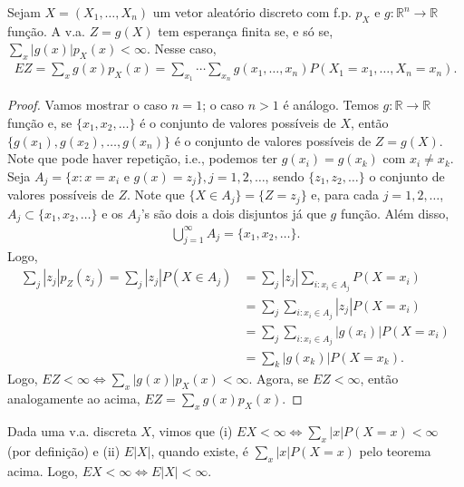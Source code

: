 \documentclass[../Notas.tex]{subfiles}
\begin{document}
\begin{theorem}
Sejam $X = (X_1, \dots, X_n)$ um vetor aleatório discreto com f.p. $p_X$ e $g:\mathbb{R}^n\to\mathbb{R}$ função. A v.a. $Z = g(X)$ tem esperança finita se, e só se, $\displaystyle{ \sum_x |g(x)|p_X(x) < \infty }$. Nesse caso,
\begin{align*}
    EZ = \sum_x g(x)p_X(x) = \sum_{x_1}\cdots\sum_{x_n} g(x_1, \dots, x_n)P(X_1 = x_1, \dots, X_n=x_n).
\end{align*}
\end{theorem}

\begin{proof}
Vamos mostrar o caso $n=1$; o caso $n>1$ é análogo. Temos $g:\mathbb{R}\to\mathbb{R}$ função e, se $\{x_1, x_2, \dots\}$ é o conjunto de valores possíveis de $X$, então $\{ g(x_1), g(x_2), \dots, g(x_n) \}$ é o conjunto de valores possíveis de $Z = g(X)$. Note que pode haver repetição, i.e., podemos ter $g(x_i) = g(x_k)$ com $x_i\neq x_k$. Seja $A_j = \{ x : x=x_i \text{ e } g(x) = z_j \}, j = 1,2,\dots$, sendo $\{z_1, z_2, \dots\}$ o conjunto de valores possíveis de $Z$. Note que $\{X\in A_j\} = \{Z=z_j\}$ e, para cada $j=1,2,\dots$, $A_j\subset\{ x_1, x_2, \dots \}$ e os $A_j$'s são dois a dois disjuntos já que $g$ função. Além disso,
\begin{align*}
    \bigcup_{j=1}^{\infty}A_j = \{x_1, x_2, \dots\}.
\end{align*}
Logo, 
\begin{align*}
\sum_j |z_j|p_Z(z_j) = \sum_j |z_j|P(X\in A_j) &= \sum_j |z_j|\sum_{i : x_i\in A_j} P(X=x_i) \\
&= \sum_j\sum_{i:x_i\in A_j} |z_j|P(X=x_i) \\
&= \sum_j\sum_{i:x_i\in A_j}|g(x_i)|P(X=x_i) \\
&= \sum_k |g(x_k)|P(X=x_k).
\end{align*}
Logo, $EZ < \infty \iff \displaystyle{ \sum_x |g(x)|p_X(x) < \infty }$. Agora, se $EZ < \infty$, então analogamente ao acima, $EZ = \displaystyle{ \sum_x g(x)p_X(x) }$.
\end{proof}

\begin{remark}
Dada uma v.a. discreta $X$, vimos que (i) $EX < \infty \iff \displaystyle{ \sum_x |x|P(X=x) < \infty }$ (por definição) e (ii) $E|X|$, quando existe, é $\displaystyle{ \sum_x |x|P(X=x)}$ pelo teorema acima. Logo, $EX < \infty \iff E|X| < \infty$.
\end{remark}
\end{document}
